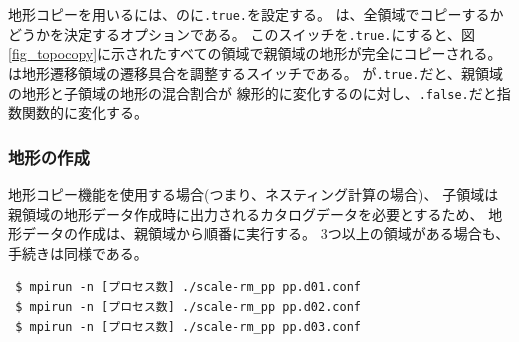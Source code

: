 \noindent 
地形コピーを用いるには、のに\verb|.true.|を設定する。
は、全領域でコピーするかどうかを決定するオプションである。
このスイッチを\verb|.true.|にすると、図\ref{fig_topocopy}に示されたすべての領域で親領域の地形が完全にコピーされる。\\
は地形遷移領域の遷移具合を調整するスイッチである。
が\verb|.true.|だと、親領域の地形と子領域の地形の混合割合が
線形的に変化するのに対し、\verb|.false.|だと指数関数的に変化する。



\subsubsection{地形の作成}

地形コピー機能を使用する場合(つまり、ネスティング計算の場合)、
子領域は親領域の地形データ作成時に出力されるカタログデータを必要とするため、
地形データの作成は、親領域から順番に実行する。
3つ以上の領域がある場合も、手続きは同様である。

\begin{verbatim}
 $ mpirun -n [プロセス数] ./scale-rm_pp pp.d01.conf
 $ mpirun -n [プロセス数] ./scale-rm_pp pp.d02.conf
 $ mpirun -n [プロセス数] ./scale-rm_pp pp.d03.conf
\end{verbatim}

